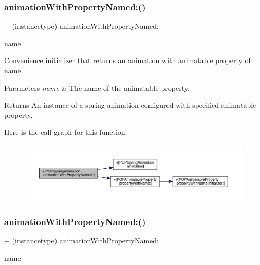 \subsubsection{\texorpdfstring{animation\+With\+Property\+Named\+:()}{animationWithPropertyNamed:()}\hspace{0.1cm}{\footnotesize\ttfamily [2/3]}}
{\footnotesize\ttfamily + (instancetype) animation\+With\+Property\+Named\+: \begin{DoxyParamCaption}\item[{(N\+S\+String $\ast$)}]{name }\end{DoxyParamCaption}}

Convenience initializer that returns an animation with animatable property of name. 
\begin{DoxyParams}{Parameters}
{\em name} & The name of the animatable property. \\
\hline
\end{DoxyParams}
\begin{DoxyReturn}{Returns}
An instance of a spring animation configured with specified animatable property. 
\end{DoxyReturn}
Here is the call graph for this function\+:\nopagebreak
\begin{figure}[H]
\begin{center}
\leavevmode
\includegraphics[width=350pt]{interface_p_o_p_spring_animation_a6e5bd208ce4b013a884c97dcebfc33b4_cgraph}
\end{center}
\end{figure}
\mbox{\label{interface_p_o_p_spring_animation_a6e5bd208ce4b013a884c97dcebfc33b4}} 
\subsubsection{\texorpdfstring{animation\+With\+Property\+Named\+:()}{animationWithPropertyNamed:()}\hspace{0.1cm}{\footnotesize\ttfamily [3/3]}}
{\footnotesize\ttfamily + (instancetype) animation\+With\+Property\+Named\+: \begin{DoxyParamCaption}\item[{(N\+S\+String $\ast$)}]{name }\end{DoxyParamCaption}}

